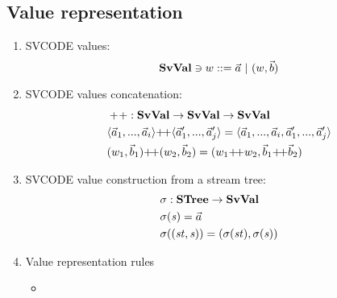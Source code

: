 \subsection{Value representation}
\begin{enumerate}
	\item SVCODE values: $$\mathbf{SvVal} \ni w ::= \vec a \ | \ (w,\vec b) $$
	\item SVCODE values concatenation: \\ 
	   \begin{align*}
	   	 &\++: \SvVal \->  \SvVal \-> \SvVal \\
	   	 &\vapp{\<\a_1,...,\a_i\'>}{\<\a_1',...,\a_j'\'>} = \<\a_1,...,\a_i,\a_1',...,\a_j'\'> \\
	   	&\vapp{(\v_1,\b_1)}{(\v_2,\b_2)} = (\vapp{\v_1}{\v_2}, \vapp{\b_1}{\b_2})
	   \end{align*}
	   
	\item SVCODE value construction from a stream tree: \\
	\begin{align*}
		&\sgm : \STree \-> \SvVal \\
		&\sgm(\s) = \a \\
		&\sgm((\st,\s)) = (\sgm(\st), \sgm(\s)) 
	\end{align*}
	
	
	\item Value representation rules
	\begin{itemize}
		
		\item {}
		
	\end{itemize}
\end{enumerate}




\begin{comment}
\PT{
	\AC{\ValRep {\lrange{v_1}{v_k}} {\tau} {\v}}
	\UC{\ValRep {\Seqk{v}}{\tseq{\tau}}{(\v,\langle \F_1,..., \F_k, \T \rangle)}}
}\\[4ex]

\item \Jug{\ValRep{\lrange{v_1}{v_k}}{\tau}{\v}}
\PT{
	\Axiom{\ValRep{\lrange{n_1}{n_k}}{\int}{\vrange{n_1}{n_k}}}
}
\PT{
	\AC{\ValRep{v_i}{\tau}{\v}}
	\UC{\ValRep{\lrange{v_1}{v_k}}{\tseq{\tau}}{}}
}

\end{comment}



